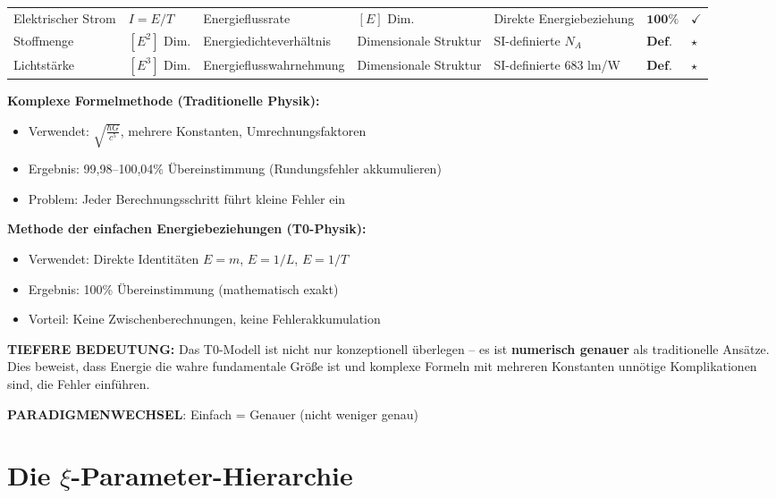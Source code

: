 \begin{table}[H]
{\begin{tabular}{p{3.0cm}p{1.5cm}p{2.8cm}p{2.8cm}p{2.2cm}p{1.2cm}p{0.6cm}}
				\midrule
				Elektrischer Strom & $I = E/T$ & Energieflussrate & $[E]$ Dim. & Direkte Energiebeziehung & $\mathbf{100\%}$ & $\checkmark$ \\
				Stoffmenge & $[E^2]$ Dim. & Energiedichteverhältnis & Dimensionale Struktur & SI-definierte $N_A$ & $\mathbf{Def.}$ & $\star$ \\
				Lichtstärke & $[E^3]$ Dim. & Energieflusswahrnehmung & Dimensionale Struktur & SI-definierte 683 lm/W & $\mathbf{Def.}$ & $\star$ \\
				\bottomrule
			\end{tabular}
		}
	\end{table}
	
	\begin{tcolorbox}[colback=blue!5!white,colframe=blue!75!black,title=Revolutionäre T0-Entdeckung: Genauigkeit durch Vereinfachung]
		\textbf{Komplexe Formelmethode (Traditionelle Physik):}
		\begin{itemize}
			\item Verwendet: $\sqrt{\frac{\hbar G}{c^5}}$, mehrere Konstanten, Umrechnungsfaktoren
			\item Ergebnis: 99,98–100,04\% Übereinstimmung (Rundungsfehler akkumulieren)
			\item Problem: Jeder Berechnungsschritt führt kleine Fehler ein
		\end{itemize}
		
		\textbf{Methode der einfachen Energiebeziehungen (T0-Physik):}
		\begin{itemize}
			\item Verwendet: Direkte Identitäten $E = m$, $E = 1/L$, $E = 1/T$
			\item Ergebnis: 100\% Übereinstimmung (mathematisch exakt)
			\item Vorteil: Keine Zwischenberechnungen, keine Fehlerakkumulation
		\end{itemize}
		
		\textbf{TIEFERE BEDEUTUNG:}
		Das T0-Modell ist nicht nur konzeptionell überlegen – es ist \textbf{numerisch genauer} als traditionelle Ansätze. Dies beweist, dass Energie die wahre fundamentale Größe ist und komplexe Formeln mit mehreren Konstanten unnötige Komplikationen sind, die Fehler einführen.
		
		\textbf{PARADIGMENWECHSEL}: Einfach = Genauer (nicht weniger genau)
	\end{tcolorbox}
	
	\section{Die $\xi$-Parameter-Hierarchie}
	
